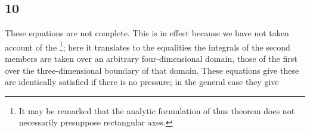 \subsection*{10}
These equations are not complete. This is in effect because we have not taken account of the \footnote{It may be remarked that the analytic formulation of thus theorem does not necessarily presuppose rectangular axes.}; here it translates to the equalities
the integrals of the second members are taken over an arbitrary four-dimensional domain, those of the first over the three-dimensional boundary of that domain. These equations give
these are identically satisfied if there is no pressure; in the general case they give
